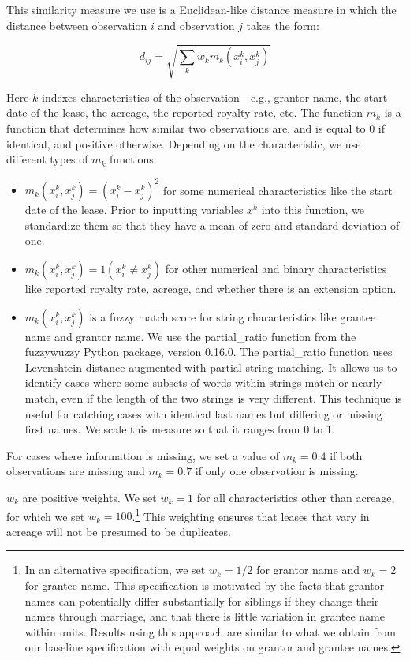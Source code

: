 \documentclass[12pt]{article}
\begin{document}
This similarity measure we use is a Euclidean-like distance measure in which the distance between observation $i$ and observation $j$ takes the form:

\begin{equation}
d_{ij} = \sqrt{\sum_k{w_k m_k(x_i^k, x_j^k)}}
\end{equation}

Here $k$ indexes characteristics of the observation---e.g., grantor name, the start date of the lease, the acreage, the reported royalty rate, etc. The function $m_k$ is a function that determines how similar two observations are, and is equal to 0 if identical, and positive otherwise. Depending on the characteristic, we use different types of $m_k$ functions:

\begin{itemize}
\item $m_k(x_i^k,x_j^k) = (x_i^k-x_j^k)^2$ for some numerical characteristics like the start date of the lease. Prior to inputting variables $x^k$ into this function, we standardize them so that they have a mean of zero and standard deviation of one.
\item $m_k(x_i^k,x_j^k) = 1(x_i^k\neq x_j^k)$ for other numerical and binary characteristics like reported royalty rate, acreage, and whether there is an extension option.
\item $m_k(x_i^k,x_j^k)$ is a fuzzy match score for string characteristics like grantee name and grantor name. We use the partial\_ratio function from the fuzzywuzzy Python package, version 0.16.0. The partial\_ratio function uses Levenshtein distance augmented with partial string matching. It allows us to identify cases where some subsets of words within strings match or nearly match, even if the length of the two strings is very different. This technique is useful for catching cases with identical last names but differing or missing first names. We scale this measure so that it ranges from 0 to 1.
\end{itemize}

For cases where information is missing, we set a value of $m_k = 0.4$ if both observations are missing and $m_k = 0.7$ if only one observation is missing.

$w_k$ are positive weights. We set $w_k = 1$ for all characteristics other than acreage, for which we set $w_k = 100$.\footnote{In an alternative specification, we set $w_k = 1/2$ for grantor name and $w_k = 2$ for grantee name. This specification is motivated by the facts that grantor names can potentially differ substantially for siblings if they change their names through marriage, and that there is little variation in grantee name within units. Results using this approach are similar to what we obtain from our baseline specification with equal weights on grantor and grantee names.} This weighting ensures that leases that vary in acreage will not be presumed to be duplicates.
\end{document}

